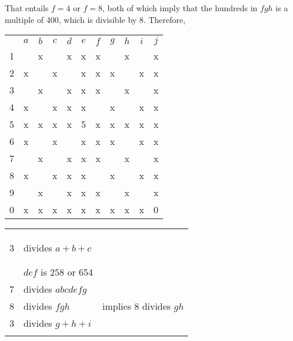 That entails $f=4$ or $f=8$, both of which imply that the hundreds in $fgh$ is a multiple of 400, which is divisible by 8.  Therefore,
\begin{center}
\begin{tabular}{ccccccccccc}
			&	$a$	&	$b$	&	$c$	&	$d$	&	$e$	&	$f$	&	$g$	&	$h$	&	$i$	&	$j$	\\
	1		&		&	x	&		&	x	&	x	&	x	&		&	x	&		&	x	\\
	2		&	x	&		&	x	&		&	x	&	x	&	x	&		&	x	&	x	\\
	3		&		&	x	&		&	x	&	x	&	x	&		&	x	&		&	x	\\
	4		&	x	&		&	x	&	x	&	x	&		&	x	&		&	x	&	x	\\
	5		&	x	&	x	&	x	&	x	&	5	&	x	&	x	&	x	&	x	&	x	\\
	6		&	x	&		&	x	&		&	x	&	x	&	x	&		&	x	&	x	\\
	7		&		&	x	&		&	x	&	x	&	x	&		&	x	&		&	x	\\
	8		&	x	&		&	x	&	x	&	x	&		&	x	&		&	x	&	x	\\
	9		&		&	x	&		&	x	&	x	&	x	&		&	x	&		&	x	\\
	0		&	x	&	x	&	x	&	x	&	x	&	x	&	x	&	x	&	x	&	0	\\
\end{tabular}
\hspace{1cm}\vline\hspace{1cm}
\begin{tabular}{rll}
	& 		\\
	& 		\\
	& 		\\
	3	&	divides $a+b+c$		\\
	& 		\\
	&		\\
	&	$def$ is 258 or 654		\\
	7	&	divides $abcdefg$	\\
	8	&	divides $fgh$		& implies 8 divides $gh$	\\
	3	&	divides $g+h+i$		\\
		&	
\end{tabular}
\end{center}

